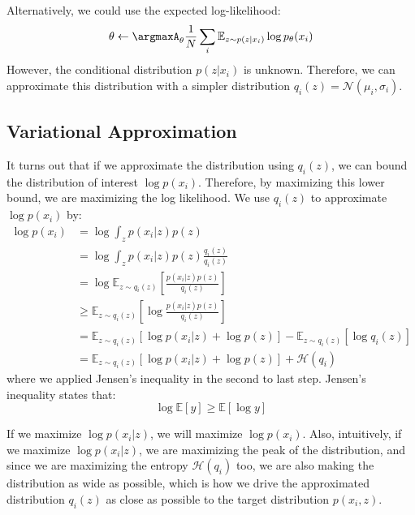Alternatively, we could use the expected log-likelihood:
\[
\theta\leftarrow \argmaxA_\theta\frac{1}{N}\sum_i\mathbb{E}_{z\sim p(z|x_i)}\log p_\theta(x_i)
\]
However, the conditional distribution $p(z|x_i)$ is unknown. Therefore, we can approximate this distribution with a simpler distribution $q_i(z) =\mathcal{N}(\mu_i,\sigma_i)$.

\subsection{Variational Approximation}
It turns out that if we approximate the distribution using $q_i(z)$, we can bound the distribution of interest $\log p(x_i)$. Therefore, by maximizing this lower bound, we are maximizing the log likelihood. We use $q_i(z)$ to approximate $\log p(x_i)$ by:
\begin{align*}
    \log p(x_i) &= \log \int_z p(x_i|z)p(z)\\
    &= \log \int_z p(x_i|z)p(z)\frac{q_i(z)}{q_i(z)}\\
    &= \log\mathbb{E}_{z\sim q_i(z)}\left[\frac{p(x_i|z)p(z)}{q_i(z)}\right]\\
    &\geq \mathbb{E}_{z\sim q_i(z)}\left[\log \frac{p(x_i|z)p(z)}{q_i(z)}\right]\\
    &=\mathbb{E}_{z\sim q_i(z)}\left[\log p(x_i|z)+\log p(z)\right]-\mathbb{E}_{z\sim q_i(z)}\left[\log q_i(z)\right]\\
    &= \mathbb{E}_{z\sim q_i(z)}\left[\log p(x_i|z)+\log p(z)\right] + \mathcal{H}(q_i)
\end{align*}
where we applied Jensen's inequality in the second to last step. Jensen's inequality states that:
\[
\log \mathbb{E}[y] \geq \mathbb{E}[\log y]
\]

If we maximize $\log p(x_i|z)$, we will maximize $\log p(x_i)$. Also, intuitively, if we maximize $\log p(x_i|z)$, we are maximizing the peak of the distribution, and since we are maximizing the entropy $\mathcal{H}(q_i)$ too, we are also making the distribution as wide as possible, which is how we drive the approximated distribution $q_i(z)$ as close as possible to the target distribution $p(x_i,z)$.

